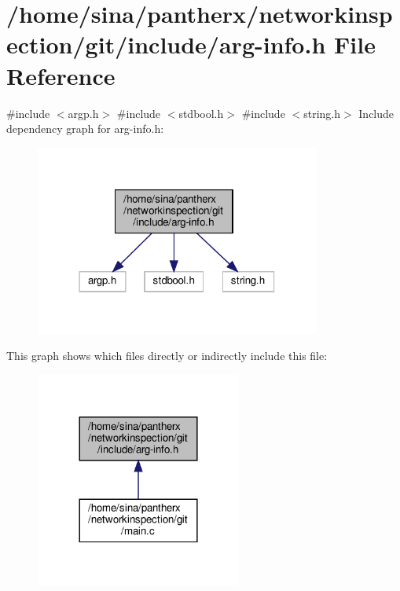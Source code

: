 \hypertarget{arg-info_8h}{}\section{/home/sina/pantherx/networkinspection/git/include/arg-\/info.h File Reference}
\label{arg-info_8h}
{\ttfamily \#include $<$argp.\+h$>$}\newline
{\ttfamily \#include $<$stdbool.\+h$>$}\newline
{\ttfamily \#include $<$string.\+h$>$}\newline
Include dependency graph for arg-\/info.h\+:\nopagebreak
\begin{figure}[H]
\begin{center}
\leavevmode
\includegraphics[width=266pt]{arg-info_8h__incl}
\end{center}
\end{figure}
This graph shows which files directly or indirectly include this file\+:\nopagebreak
\begin{figure}[H]
\begin{center}
\leavevmode
\includegraphics[width=192pt]{arg-info_8h__dep__incl}
\end{center}
\end{figure}
